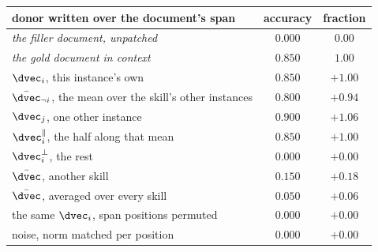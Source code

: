 \begin{tabular}{@{}lcc@{}}
\toprule
\rowcolor{TableHeader}
donor written over the document's span & accuracy & fraction \\
\midrule
\emph{the filler document, unpatched} & $0.000$ & $0.00$ \\
\emph{the gold document in context} & $0.850$ & $1.00$ \\
\midrule
$\dvec_i$, this instance's own & $0.850$ & $+1.00$ \\
$\bar{\dvec}_{\neg i}$, the mean over the skill's other instances & $0.800$ & $+0.94$ \\
$\dvec_j$, one other instance & $0.900$ & $+1.06$ \\
$\dvec_i^{\parallel}$, the half along that mean & $0.850$ & $+1.00$ \\
$\dvec_i^{\perp}$, the rest & $0.000$ & $+0.00$ \\
$\bar{\dvec}$, another skill & $0.150$ & $+0.18$ \\
$\bar{\dvec}$, averaged over every skill & $0.050$ & $+0.06$ \\
the same $\dvec_i$, span positions permuted & $0.000$ & $+0.00$ \\
noise, norm matched per position & $0.000$ & $+0.00$ \\
\bottomrule
\end{tabular}
